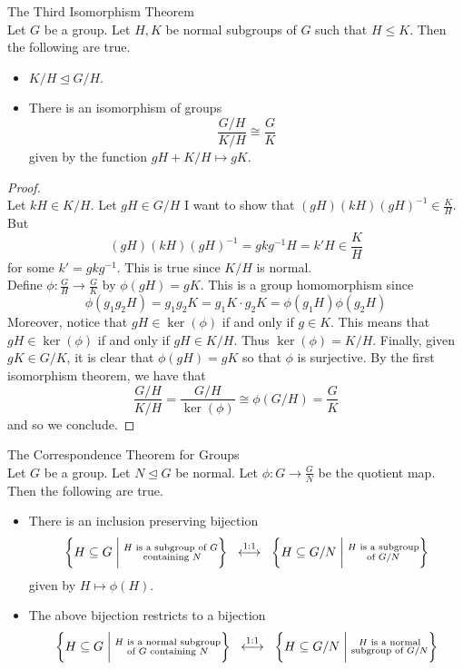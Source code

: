\documentclass[a4paper]{article}
\begin{document}
\begin{thm}{The Third Isomorphism Theorem}{}\\
Let $G$ be a group. Let $H,K$ be normal subgroups of $G$ such that $H\leq K$. Then the following are true. 
\begin{itemize}
\item $K/H\trianglelefteq G/H$. 
\item There is an isomorphism of groups $$\frac{G/H}{K/H}\cong\frac{G}{K}$$ given by the function $gH+K/H\mapsto gK$. 
\end{itemize}
\begin{proof}\\
Let $kH\in K/H$. Let $gH\in G/H$ I want to show that $(gH)(kH)(gH)^{-1}\in\frac{K}{H}$. But $$(gH)(kH)(gH)^{-1}=gkg^{-1}H=k'H\in\frac{K}{H}$$ for some $k'=gkg^{-1}$. This is true since $K/H$ is normal. \\

Define $\phi:\frac{G}{H}\to\frac{G}{K}$ by $\phi(gH)=gK$. This is a group homomorphism since $$\phi(g_1g_2H)=g_1g_2K=g_1K\cdot g_2K=\phi(g_1H)\phi(g_2H)$$ Moreover, notice that $gH\in\ker(\phi)$ if and only if $g\in K$. This means that $gH\in\ker(\phi)$ if and only if $gH\in K/H$. Thus $\ker(\phi)=K/H$. Finally, given $gK\in G/K$, it is clear that $\phi(gH)=gK$ so that $\phi$ is surjective. By the first isomorphism theorem, we have that $$\frac{G/H}{K/H}=\frac{G/H}{\ker(\phi)}\cong\phi(G/H)=\frac{G}{K}$$ and so we conclude. 
\end{proof}
\end{thm}

\begin{thm}{The Correspondence Theorem for Groups}{}\\
Let $G$ be a group. Let $N\trianglelefteq G$ be normal. Let $\phi:G\to\frac{G}{N}$ be the quotient map. Then the following are true. 
\begin{itemize}
\item There is an inclusion preserving bijection $$\left\{H\subseteq G\;\bigg{|}\;\substack{H\text{ is a subgroup of }G\\\text{ containing }N}\right\}\;\;\overset{1:1}{\longleftrightarrow}\;\;\left\{H\subseteq G/N\;\bigg{|}\;\substack{H\text{ is a subgroup}\\\text{of }G/N}\right\}$$ given by $H\mapsto\phi(H)$. 
\item The above bijection restricts to a bijection $$\left\{H\subseteq G\;\bigg{|}\;\substack{H\text{ is a normal subgroup}\\\text{of }G\text{ containing }N}\right\}\;\;\overset{1:1}{\longleftrightarrow}\;\;\left\{H\subseteq G/N\;\bigg{|}\;\substack{H\text{ is a normal}\\\text{subgroup of }G/N}\right\}$$
\end{itemize}
\end{thm}
\end{document}
